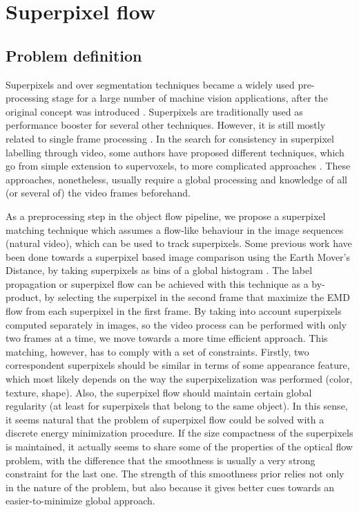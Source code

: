 
\section{Superpixel flow} \label{sec:suppix}

\subsection{Problem definition}
Superpixels and over segmentation techniques became a widely used pre-processing 
stage for a large number of machine vision applications, after the
original concept was introduced \cite{c1}. Superpixels are traditionally used as 
performance booster for several other techniques. However, it is still mostly related to
single frame processing \cite{c1}\cite{c10}\cite{c11}. In the search for
consistency in superpixel labelling through video, some authors have proposed different 
techniques, which go from simple extension to supervoxels\cite{c9}\cite{c11},
to more complicated approaches \cite{c8}. These approaches, nonetheless, usually require a 
global processing and knowledge of all (or several of) the video frames beforehand. 

As a preprocessing step in the object flow pipeline, we propose a superpixel matching technique which assumes a flow-like behaviour in the image 
sequences (natural video), which can be used to track superpixels. 
Some previous work have been done towards a
superpixel based image comparison using the Earth Mover's Distance, by taking superpixels 
as bins of a global histogram \cite{c2}. The label propagation or superpixel flow can be
achieved with this technique as a by-product, by selecting the superpixel in the second frame that 
maximize the EMD flow from each superpixel in the first frame.
By taking into account superpixels computed separately in images, so the video process can be 
performed with only two frames at a time, we move towards a more time efficient approach. 
This matching, however, has to comply with a set of constraints. 
Firstly, two correspondent superpixels should be similar in terms of some appearance
feature, which most likely depends on the way the superpixelization was performed (color, texture,
shape). Also, the superpixel flow  should maintain certain global regularity (at least for
superpixels that belong to the same object). In this sense, it seems
natural that the problem of superpixel flow could be solved with a discrete energy minimization
procedure. 
If the size compactness of the superpixels is maintained,  it actually seems to 
share some of the properties of the optical flow problem, with the difference that the
smoothness is usually a very strong constraint for the last one. 
The strength of this smoothness prior relies not only in the nature of the problem, but also
because it gives better cues towards an easier-to-minimize global approach.

